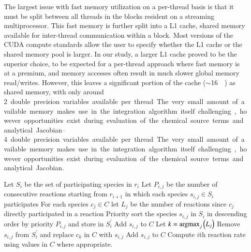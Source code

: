 \documentclass[preprint]{elsarticle}
\newcommand{\argmax}{\operatornamewithlimits{argmax}}
\begin{document}
The largest issue with fast memory utilization on a per-thread basis is that it must be split between all threads in the blocks resident on a streaming multiprocessor.
This fast memory is further split into a L1 cache, shared memory available for inter-thread communication within a block.
Most versions of the CUDA compute standards allow the user to specify whether the L1 cache or the shared memory pool is larger.
In our study, a larger L1 cache proved to be the superior choice, to be expected for a per-thread approach where fast memory is at a premium, and memory accesses often result in much slower global memory read/writes.
However, this leaves a significant portion of the cache ($\sim$\SI{16}{\kilo\byte}) as shared memory, with only around \SIrange{2}{4} double precision variables available per thread.
The very small amount of available memory makes use in the integration algorithm itself challenging, however opportunities exist during evaluation of the chemical source terms and analytical Jacobian.

\begin{algorithm}[htb]
\caption{Shared memory caching during evaluation of reaction rates.}
\begin{algorithmic}[0]
    \State Let $S_i$ be the set of participating species in $r_i$
    \State Let $P_{i,j}$ be the number of consecutive reactions starting from $r_{i + 1}$ in which each species $s_{i,j} \in S_i$ participates
    \State For each species $c_j \in C$ let $L_j$ be the number of reactions since $c_j$ directly participated in a reaction
    \State Priority sort the species $s_{i,j}$ in $S_{i}$ in descending order by priority $P_{i,j}$ and store in $S_{i}^{\prime}$
		\State Add $s_{i,j}$ to $C$
	  \State Let $k = \argmax_j \left(L_j \right)$
	  \State Remove $s_{i,j}$ from $S_{i}^{\prime}$ and replace $c_k$ in $C$ with $s_{i,j}$
      \EndIf
    \EndFor
		\State Add $s_{i,j}$ to $C$
      \EndIf
    \EndFor
    \State Compute $i$th reaction rate using values in $C$ where appropriate.
  \EndFor
\end{algorithmic}
\label{A:shared_mem_caching}
\end{algorithm}
\end{document}
